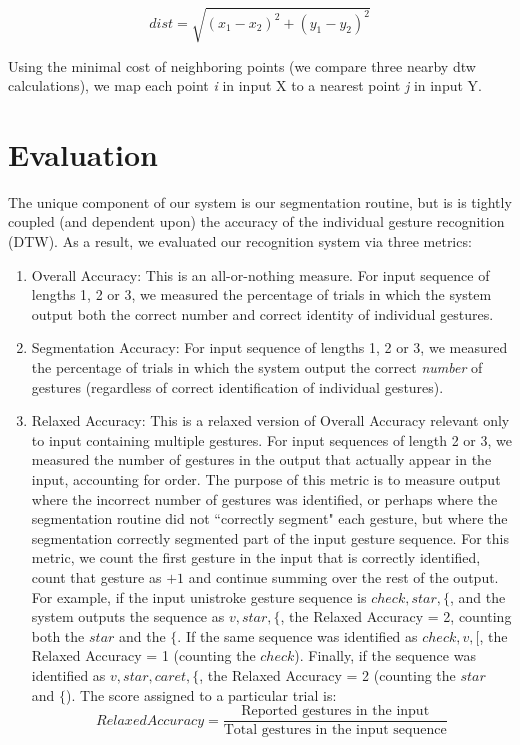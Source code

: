 \documentclass[twoside]{article}
\begin{document}
\begin{multicols}{2}
\[
 dist = \displaystyle\sqrt{(x_1-x_2)^2 + (y_1-y_2)^2}
\]

Using the minimal cost of neighboring points (we compare three nearby dtw calculations),
we map each point \emph{i} in input X to a nearest point \emph{j} in input Y.

\section{Evaluation}


The unique component of our system is our segmentation routine, but is is tightly coupled (and dependent upon) the accuracy of the individual gesture recognition (DTW). As a result, we evaluated our recognition system via three metrics:
\begin{enumerate}
\item Overall Accuracy: This is an all-or-nothing measure. For input sequence of
lengths 1, 2 or 3, we measured the percentage of trials in which the system
output both the correct number and correct identity of individual gestures.

\item
Segmentation Accuracy: For input sequence of lengths 1, 2 or 3, we measured the
percentage of trials in which the system output the correct \emph{number} of
gestures (regardless of correct identification of individual gestures).

\item Relaxed Accuracy: This is a relaxed version of Overall Accuracy relevant
only to input containing multiple gestures. For input sequences of length 2 or 3,
we measured the number of gestures in the output that actually appear in the input, accounting for order.
The purpose of this metric is to measure output where the incorrect number of gestures was identified, or perhaps where the segmentation routine did not ``correctly segment" each gesture, but where the segmentation correctly segmented part of the input gesture sequence.
For this metric, we count the first gesture in the input that is correctly identified, count that gesture as $+1$ and continue
summing over the rest of the output. For example, if the input unistroke gesture sequence is $check, star, \{$, and the system
outputs the sequence as $v, star, \{$, the
Relaxed Accuracy = 2, counting both the $star$ and the $\{$. If the same sequence was identified as $check, v, [$, the Relaxed
Accuracy = 1 (counting the $check$). Finally, if the sequence was identified as $v, star, caret, \{$, the Relaxed Accuracy = 2 (counting the $star$ and $\{$).
The score assigned to a particular trial is:
\[
		Relaxed Accuracy = \frac{\text{Reported gestures in the input}}{\text{Total gestures in the input sequence}}
	\]
\end{enumerate}


\end{multicols}
\end{document}
